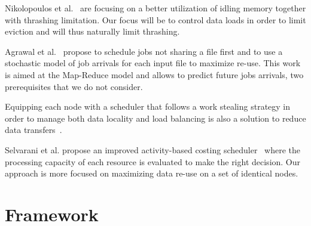 \documentclass[conference,10pt]{IEEEtran}
\begin{document}
Nikolopoulos et al.~\cite{Nikolopoulos2003AdaptiveSU}
are focusing on a better utilization of idling memory together with 
thrashing limitation.
Our focus will be to control data loads in order to limit eviction
and will thus naturally limit thrashing.

Agrawal et al.~\cite{Scheduling_Shared_Scans_of_Large_Data_Files}
propose to schedule jobs not sharing a file first
and to use a stochastic model of job arrivals for each input file to maximize re-use.
This work is aimed at the Map-Reduce model and allows to predict future jobs arrivals, two prerequisites that we do not consider.

Equipping each node with a scheduler that follows a work
stealing strategy in order to manage both data locality 
and load balancing is also a solution to reduce data transfers~\cite{Optimizing_load_balancing_and_data_locality_with_data_aware_scheduling}.

Selvarani et al. propose an improved activity-based costing scheduler~\cite{Improved_cost_based_algorithm}
where the processing capacity of each resource is evaluated to make the right decision.
Our approach is more focused on maximizing data re-use on a 
set of identical nodes.


\section{Framework}\label{sec.framework}
\end{document}
